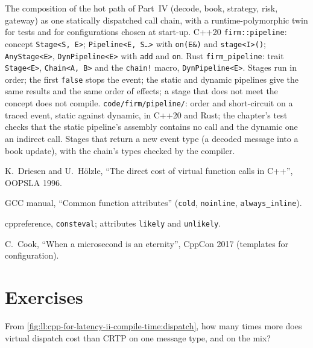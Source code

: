 \begin{build}
 The composition of the hot path of Part~IV (decode, book, strategy, risk, gateway) as one statically
dispatched call chain, with a runtime-polymorphic twin for tests and for configurations chosen at start-up.
 C++20 \texttt{firm::pipeline}: concept \texttt{Stage<S, E>}; \texttt{Pipeline<E, S\dots>} with
\texttt{on(E\&)} and \texttt{stage<I>()}; \texttt{AnyStage<E>}, \texttt{DynPipeline<E>} with \texttt{add} and \texttt{on}.
Rust \texttt{firm\_pipeline}: trait \texttt{Stage<E>}, \texttt{Chain<A, B>} and the \texttt{chain!} macro,
\texttt{DynPipeline<E>}.
 Stages run in order; the first \texttt{false} stops the event; the static and dynamic pipelines give the same
results and the same order of effects; a stage that does not meet the concept does not compile.
 \texttt{code/firm/pipeline/}: order and short-circuit on a traced event, static against dynamic, in
C++20 and Rust; the chapter's test checks that the static pipeline's assembly contains no call and the dynamic one an
indirect call.
 Stages that return a new event type (a decoded message into a book update), with the chain's types checked
by the compiler.
\end{build}

\begin{omsources}
\item K.~Driesen and U.~Hölzle, ``The direct cost of virtual function calls in C++'', OOPSLA 1996.
\item GCC manual, ``Common function attributes'' (\texttt{cold}, \texttt{noinline}, \texttt{always\_inline}).
\item cppreference, \texttt{consteval}; attributes \texttt{likely} and \texttt{unlikely}.
\item C.~Cook, ``When a microsecond is an eternity'', CppCon 2017 (templates for configuration).
\end{omsources}

\section{Exercises}

\begin{exercise}[$\star$]\label{exo:ll:cpp-for-latency-ii-compile-time:1}
From \cref{fig:ll:cpp-for-latency-ii-compile-time:dispatch}, how many times more does virtual dispatch cost than CRTP on one
message type, and on the mix?
\end{exercise}

